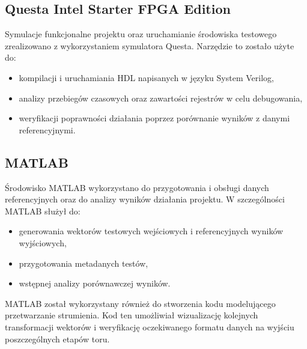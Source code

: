 \subsection{Questa Intel Starter FPGA Edition}
Symulacje funkcjonalne projektu oraz uruchamianie środowiska testowego zrealizowano z wykorzystaniem symulatora Questa. Narzędzie to zostało użyte do:
\begin{itemize}
    \item kompilacji i uruchamiania  HDL napisanych w języku System Verilog,
    \item analizy przebiegów czasowych oraz zawartości rejestrów w celu debugowania,
    \item weryfikacji poprawności działania poprzez porównanie wyników z danymi referencyjnymi.
\end{itemize}

\subsection{MATLAB}
Środowisko MATLAB wykorzystano do przygotowania i obsługi danych referencyjnych oraz do analizy wyników działania projektu. W szczególności MATLAB służył do:
\begin{itemize}
    \item generowania wektorów testowych wejściowych i referencyjnych wyników wyjściowych,
    \item przygotowania metadanych testów,
    \item wstępnej analizy porównawczej wyników.
\end{itemize}

MATLAB został wykorzystany również do stworzenia kodu modelującego przetwarzanie strumienia. Kod ten umożliwiał wizualizację kolejnych transformacji wektorów i weryfikację oczekiwanego formatu danych na wyjściu poszczególnych etapów toru.
